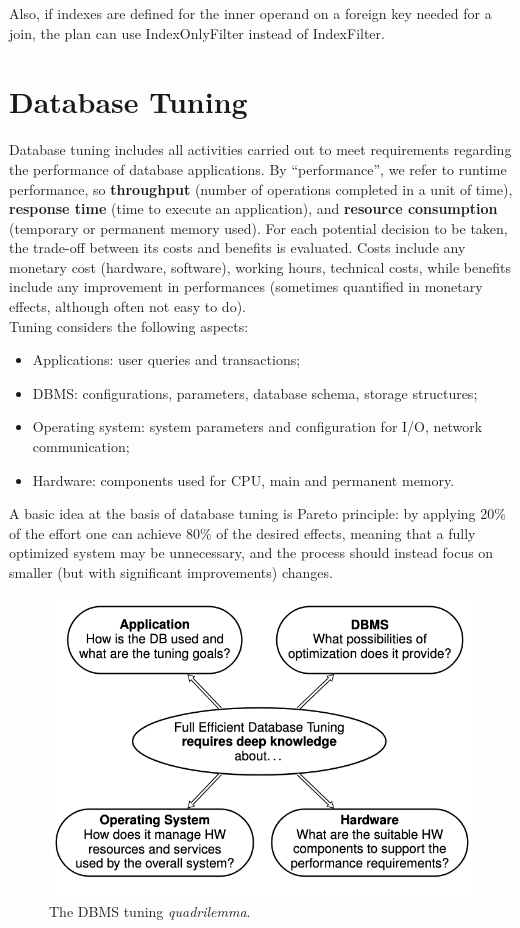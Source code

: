 Also, if indexes are defined for the inner operand on a foreign key needed for a join, the plan can use IndexOnlyFilter instead of IndexFilter.

\section{Database Tuning}

Database tuning includes all activities carried out to meet requirements regarding the performance of database applications. By ``performance'', we refer to runtime performance, so \textbf{throughput} (number of operations completed in a unit of time), \textbf{response time} (time to execute an application), and \textbf{resource consumption} (temporary or permanent memory used). For each potential decision to be taken, the trade-off between its costs and benefits is evaluated. Costs include any monetary cost (hardware, software), working hours, technical costs, while benefits include any improvement in performances (sometimes quantified in monetary effects, although often not easy to do). \\
Tuning considers the following aspects:
\begin{itemize}
    \item Applications: user queries and transactions;
    \item DBMS: configurations, parameters, database schema, storage structures;
    \item Operating system: system parameters and configuration for I/O, network communication;
    \item Hardware: components used for CPU, main and permanent memory.
\end{itemize}
A basic idea at the basis of database tuning is Pareto principle: by applying 20\% of the effort one can achieve 80\% of the desired effects, meaning that a fully optimized system may be unnecessary, and the process should instead focus on smaller (but with significant improvements) changes.
\begin{figure}[h]
    \centering
    \includegraphics[width=0.5\linewidth]{img/quadrilemma.png}
    \caption{The DBMS tuning \textit{quadrilemma}.}
    \label{fig:quadrilemma}
\end{figure}

